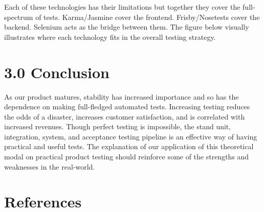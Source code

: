 \documentclass[12pt]{report}
\begin{document}
\par\noindent
Each of these technologies has their limitations but together they cover the full-spectrum of tests. Karma/Jasmine cover the frontend. Frisby/Nosetests cover the backend. Selenium acts as the bridge between them. The figure below visually illustrates where each technology fits in the overall testing strategy.

\newpage\thispagestyle{fancy}\sectionfont{\scshape}
\section*{3.0 Conclusion}
\par\noindent
As our product matures, stability has increased importance and so has the dependence on making full-fledged automated tests. Increasing testing reduces the odds of a disaster, increases customer satisfaction, and is correlated with increased revenues. Though perfect testing is impossible, the stand unit, integration, system, and acceptance testing pipeline is an effective way of having practical and useful tests. The explanation of our application of this theoretical modal on practical product testing should reinforce some of the strengths and weaknesses in the real-world.

 \noindent

\newpage
\section*{References}
\end{document}
